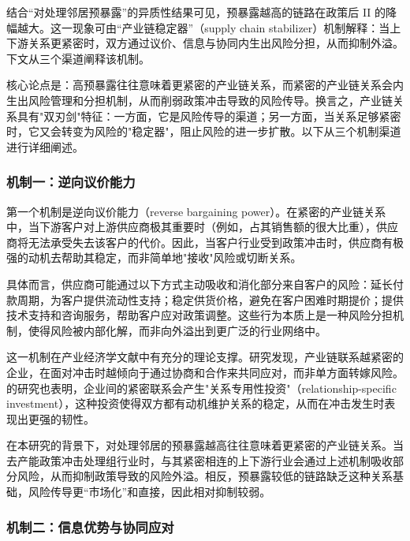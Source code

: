 
结合“对处理邻居预暴露”的异质性结果可见，预暴露越高的链路在政策后 II 的降幅越大。这一现象可由“产业链稳定器”（supply chain stabilizer）机制解释：当上下游关系更紧密时，双方通过议价、信息与协同内生出风险分担，从而抑制外溢。下文从三个渠道阐释该机制。

核心论点是：高预暴露往往意味着更紧密的产业链关系，而紧密的产业链关系会内生出风险管理和分担机制，从而削弱政策冲击导致的风险传导。换言之，产业链关系具有"双刃剑"特征：一方面，它是风险传导的渠道；另一方面，当关系足够紧密时，它又会转变为风险的"稳定器"，阻止风险的进一步扩散。以下从三个机制渠道进行详细阐述。

\subsubsection*{机制一：逆向议价能力}

第一个机制是逆向议价能力（reverse bargaining power）。在紧密的产业链关系中，当下游客户对上游供应商极其重要时（例如，占其销售额的很大比重），供应商将无法承受失去该客户的代价。因此，当客户行业受到政策冲击时，供应商有极强的动机去帮助其稳定，而非简单地"接收"风险或切断关系。

具体而言，供应商可能通过以下方式主动吸收和消化部分来自客户的风险：延长付款周期，为客户提供流动性支持；稳定供货价格，避免在客户困难时期提价；提供技术支持和咨询服务，帮助客户应对政策调整。这些行为本质上是一种风险分担机制，使得风险被内部化解，而非向外溢出到更广泛的行业网络中。

这一机制在产业经济学文献中有充分的理论支撑。\citet{ahern2014importance}研究发现，产业链联系越紧密的企业，在面对冲击时越倾向于通过协商和合作来共同应对，而非单方面转嫁风险。\citet{hertzel2008intra}的研究也表明，企业间的紧密联系会产生"关系专用性投资"（relationship-specific investment），这种投资使得双方都有动机维护关系的稳定，从而在冲击发生时表现出更强的韧性。

在本研究的背景下，对处理邻居的预暴露越高往往意味着更紧密的产业链关系。当去产能政策冲击处理组行业时，与其紧密相连的上下游行业会通过上述机制吸收部分风险，从而抑制政策导致的风险外溢。相反，预暴露较低的链路缺乏这种关系基础，风险传导更“市场化”和直接，因此相对抑制较弱。

\subsubsection*{机制二：信息优势与协同应对}

